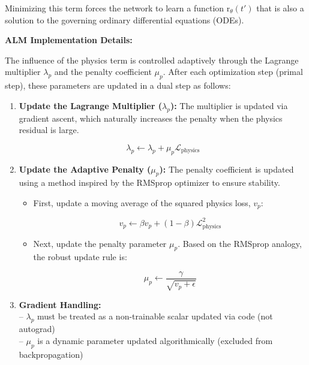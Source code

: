 Minimizing this term forces the network to learn a function $\mathrm{r}_\theta(t')$ that is also a solution to the governing ordinary differential equations (ODEs).

\textbf{ALM Implementation Details:}

The influence of the physics term is controlled adaptively through the Lagrange multiplier $\lambda_p$ and the penalty coefficient $\mu_p$. After each optimization step (primal step), these parameters are updated in a dual step as follows:

\begin{enumerate}
    \item \textbf{Update the Lagrange Multiplier ($\lambda_p$):} The multiplier is updated via gradient ascent, which naturally increases the penalty when the physics residual is large.

    \[
    \lambda_p \leftarrow \lambda_p + \mu_p \mathcal{L}_{\text{physics}}
    \]


    \item \textbf{Update the Adaptive Penalty ($\mu_p$):} The penalty coefficient is updated using a method inspired by the RMSprop optimizer to ensure stability.
    \begin{itemize}
        \item First, update a moving average of the squared physics loss, $v_p$:

        \[
        v_p \leftarrow \beta v_p + (1 - \beta) \mathcal{L}_{\text{physics}}^2
        \]

        \item Next, update the penalty parameter $\mu_p$. Based on the RMSprop analogy, the robust update rule is:

        \[
        \mu_p \leftarrow \frac{\gamma}{\sqrt{v_p + \epsilon}}
        \]
    \end{itemize}

    \item \textbf{Gradient Handling:} \\
    -- $\lambda_p$ must be treated as a non-trainable scalar updated via code (not autograd) \\
    -- $\mu_p$ is a dynamic parameter updated algorithmically (excluded from backpropagation)
\end{enumerate}

